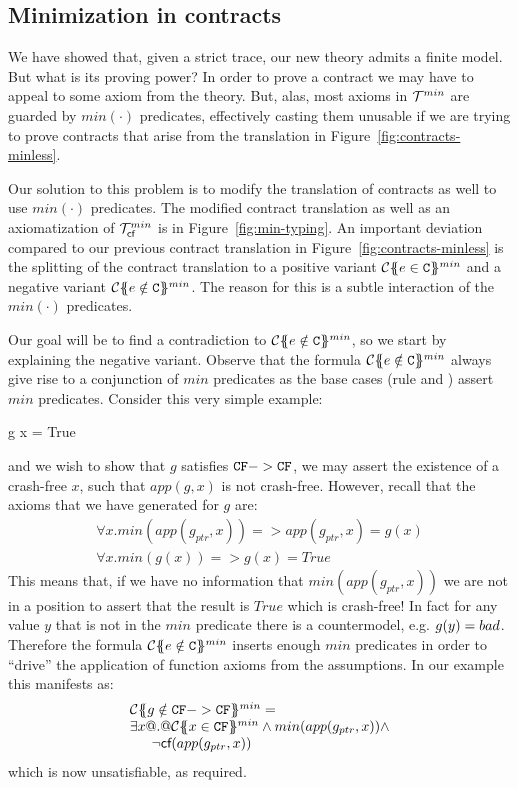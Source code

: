 \subsection{Minimization in contracts}

We have showed that, given a strict trace, our new theory admits a finite model. But what is its proving
power? In order to prove a contract we may have to appeal to some axiom from the theory. But, alas, most
axioms in ${\cal T}^{min}$ are guarded by $min(\cdot)$ predicates, effectively casting them unusable if we are
trying to prove contracts that arise from the translation in Figure~\ref{fig:contracts-minless}.

Our solution to this problem is to modify the translation of contracts as well to use $min(\cdot)$ predicates.
The modified contract translation as well as an axiomatization of ${\cal T}_{\textsf{cf}}^{min}$ is in Figure~\ref{fig:min-typing}.
An important deviation compared to our previous contract translation in Figure~\ref{fig:contracts-minless} is the
splitting of the contract translation to a positive variant ${\cal C}\{\!\!\{e \in {\tt C}\}\!\!\}^{min}$ and a negative
variant ${\cal C}\{\!\!\{e \notin {\tt C}\}\!\!\}^{min}$. The reason for this is a subtle interaction of the $min(\cdot)$
predicates.

Our goal will be to find a contradiction to ${\cal C}\{\!\!\{e \notin {\tt C}\}\!\!\}^{min}$, so we start by explaining
the negative variant. Observe that the formula ${\cal C}\{\!\!\{e \notin {\tt C}\}\!\!\}^{min}$
always give rise to a conjunction of $min$ predicates as the base cases (rule  and )
assert $min$ predicates. Consider this very simple example:
\begin{code}
g x  = True
\end{code}
and we wish to show that $g$ satisfies ${\tt CF} -> {\tt CF}$, we may assert the existence of a crash-free $x$, such that
$app(g,x)$ is not crash-free. However, recall that the axioms that we have generated for $g$ are:
\[\begin{array}{l}
   \forall x. min(app(g_{ptr},x)) => app(g_{ptr},x) = g(x) \\
   \forall x. min(g(x)) => g(x) = True
\end{array}\]
This means that, if we have no information that $min(app(g_{ptr},x))$ we are not in a position
to assert that the result is $True$ which is crash-free! In fact for any value $y$ that is not
in the $min$ predicate there is a countermodel, e.g. $g(y) = \mathop{bad}$. Therefore the formula
${\cal C}\{\!\!\{e \notin {\tt C}\}\!\!\}^{min}$ inserts enough $min$ predicates in order to ``drive''
the application of function axioms from the assumptions. In our example this manifests as:
\[\begin{array}{l}
   \ctransmin{}{}{g \notin \CF -> \CF} = \\
  \exists x @.@ \ctransmin{}{}{x \in \CF} \land min(app(g_{ptr},x)) \land \\
  \quad\;\; \neg\lcf{app(g_{ptr},x)}
\end{array}\]
which is now unsatisfiable, as required.

